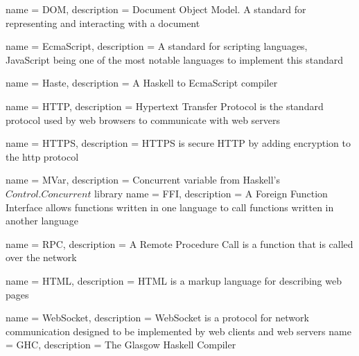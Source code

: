 {
    name = DOM,
    description = {Document Object Model. A standard for representing and interacting with a document}
}

{
    name = EcmaScript,
    description = {A standard for scripting languages, JavaScript being one of the most notable languages to implement this standard}
}

{
    name = Haste,
    description = {A Haskell to EcmaScript compiler}
}

{
    name = HTTP,
    description = {Hypertext Transfer Protocol is the standard protocol used by web browsers to communicate with web servers}
}

{
    name = HTTPS,
    description = {HTTPS is secure HTTP by adding encryption to the \gls{http} protocol}
}

{
    name = MVar,
    description = {Concurrent variable from Haskell's $Control.Concurrent$ library}
}
{
    name = FFI,
    description = {A Foreign Function Interface allows functions written in one language to call functions written in another language}
}

{
    name = RPC,
    description = {A Remote Procedure Call is a function that is called over the network}
}

{
    name = HTML,
    description = {HTML is a markup language for describing web pages}
}

{
    name = WebSocket,
    description = {WebSocket is a protocol for network communication designed to be implemented by web clients and web servers}
}
{
    name = GHC,
    description = {The Glasgow Haskell Compiler}
}
